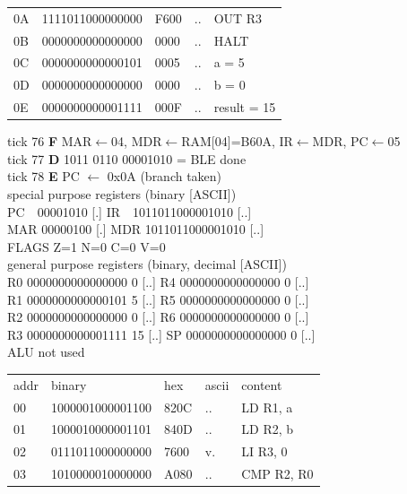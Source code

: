 \begin{tcolorbox}[stepbox, title={Instruction 25 \hfill ticks 73 to 75 \quad CMP R2, R0}]
{\begin{tabular}{@{}lllll@{}}
0A & 1111011000000000 & F600 & .. & OUT R3\\
0B & 0000000000000000 & 0000 & .. & HALT\\
\rowcolor{datac}0C & 0000000000000101 & 0005 & .. & a = 5\\
\rowcolor{datac}0D & 0000000000000000 & 0000 & .. & b = 0\\
\rowcolor{datac}0E & 0000000000001111 & 000F & .. & result = 15\\
\end{tabular}}
\end{tcolorbox}\hfill\begin{tcolorbox}[stepbox, title={Instruction 26 \hfill ticks 76 to 78 \quad BLE done}]
\textcolor{dim}{tick 76} \textbf{F} MAR$\leftarrow$04, MDR$\leftarrow$RAM[04]=B60A, IR$\leftarrow$MDR, PC$\leftarrow$05\\
\textcolor{dim}{tick 77} \textbf{D} 1011 0110 00001010 = BLE done\\
\textcolor{dim}{tick 78} \textbf{E} PC $\leftarrow$ 0x0A (branch taken)\\[2pt]
\textcolor{dim}{special purpose registers (binary [ASCII])}\\
PC~~00001010 [.] \hfill IR~~1011011000001010 [..]\\
MAR 00000100 [.] \hfill MDR 1011011000001010 [..]\\
FLAGS Z=1 N=0 C=0 V=0\\[2pt]
\textcolor{dim}{general purpose registers (binary, decimal [ASCII])}\\
R0 0000000000000000 0 [..] \hfill R4 0000000000000000 0 [..]\\
R1 0000000000000101 5 [..] \hfill R5 0000000000000000 0 [..]\\
R2 0000000000000000 0 [..] \hfill R6 0000000000000000 0 [..]\\
R3 0000000000001111 15 [..] \hfill SP 0000000000000000 0 [..]\\
\textcolor{dim}{ALU not used}\\[2pt]
{\setlength{\tabcolsep}{2pt}\begin{tabular}{@{}lllll@{}}
\textcolor{dim}{addr} & \textcolor{dim}{binary} & \textcolor{dim}{hex} & \textcolor{dim}{ascii} & \textcolor{dim}{content}\\
00 & 1000001000001100 & 820C & .. & LD R1, a\\
01 & 1000010000001101 & 840D & .. & LD R2, b\\
02 & 0111011000000000 & 7600 & v. & LI R3, 0\\
03 & 1010000010000000 & A080 & .. & CMP R2, R0\\

\end{tabular}}
\end{tcolorbox}
